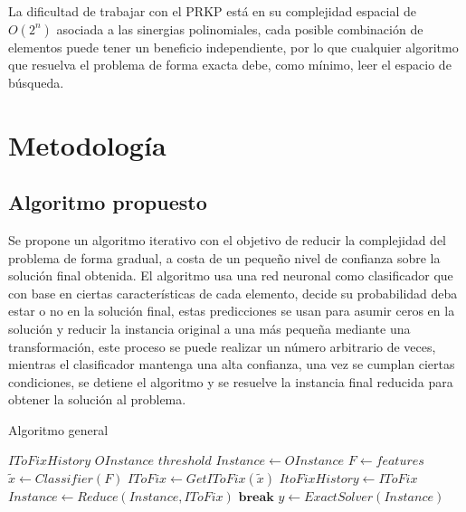 \documentclass[spanish, a4paper, 12pt, twoside, openany,final]{book}
\numberwithin{equation}{section}
\begin{document}
    La dificultad de trabajar con el PRKP está en su complejidad espacial de $O\left( 2^n\right)$ asociada a las sinergias polinomiales, cada posible combinación de elementos puede tener un beneficio independiente, por lo que cualquier algoritmo que resuelva el problema de forma exacta debe, como mínimo, leer el espacio de búsqueda.
\clearpage
  
\chapter{Metodología}

\section{Algoritmo propuesto}

Se propone un algoritmo iterativo con el objetivo de reducir la complejidad del problema de forma gradual, a costa de un pequeño nivel de confianza sobre la solución final obtenida. El algoritmo usa una red neuronal como clasificador que con base en ciertas características de cada elemento, decide su probabilidad deba estar o no en la solución final, estas predicciones se usan para asumir ceros en la solución y reducir la instancia original a una más pequeña mediante una transformación, este proceso se puede realizar un número arbitrario de veces, mientras el clasificador mantenga una alta confianza, una vez se cumplan ciertas condiciones, se detiene el algoritmo y se resuelve la instancia final reducida para obtener la solución al problema.

\begin{algorithm}[H]
	\caption{Algoritmo general}\label{alg:general}
	\begin{algorithmic}
		\State $IToFixHistory$ 			
		\State $OInstance$ 				
		\State $threshold$  			
		\State $Instance \gets OInstance$
		\Loop
			\State $F \gets features$ 
			\State $\tilde{x} \gets Classifier(F)$ 
			\State $IToFix \gets GetIToFix(\tilde{x})$ 
			\State $ItoFixHistory \gets IToFix$
			\State $Instance \gets Reduce(Instance,IToFix)$ 
				\State $\textbf{break}$ 
			\EndIf
		\State $y \gets ExactSolver(Instance)$ 
		\EndLoop
	\end{algorithmic}
\end{algorithm}
\end{document}

